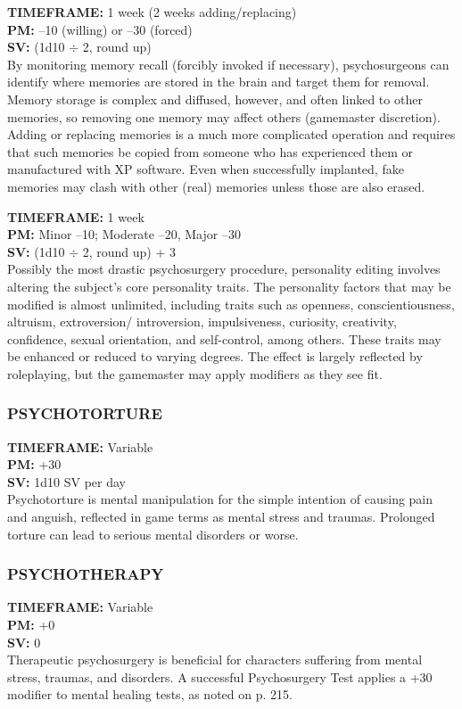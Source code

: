  \textbf{TIMEFRAME:} 1 week (2 weeks adding/replacing) \\ \textbf{PM:} –10 (willing) or –30 (forced) \\ \textbf{SV:} (1d10 $\div$ 2, round up) \\ By monitoring memory recall (forcibly invoked if necessary), psychosurgeons can identify where memories are stored in the brain and target them for removal. Memory storage is complex and diffused, however, and often linked to other memories, so removing one memory may affect others (gamemaster discretion). Adding or replacing memories is a much more complicated operation and requires that such memories be copied from someone who has experienced them or manufactured with XP software. Even when successfully implanted, fake memories may clash with other (real) memories unless those are also erased. 

 \textbf{TIMEFRAME:} 1 week \\ \textbf{PM:} Minor –10; Moderate –20, Major –30 \\ \textbf{SV:} (1d10 $\div$ 2, round up) + 3 \\ Possibly the most drastic psychosurgery procedure, personality editing involves altering the subject’s core personality traits. The personality factors that may be modified is almost unlimited, including traits such as openness, conscientiousness, altruism, extroversion/ introversion, impulsiveness, curiosity, creativity, confidence, sexual orientation, and self-control, among others. These traits may be enhanced or reduced to varying degrees. The effect is largely reflected by roleplaying, but the gamemaster may apply modifiers as they see fit. 

\subsubsection{PSYCHOTORTURE} \textbf{TIMEFRAME:} Variable \\ \textbf{PM:} +30 \\ \textbf{SV:} 1d10 SV per day \\ Psychotorture is mental manipulation for the simple intention of causing pain and anguish, reflected in game terms as mental stress and traumas. Prolonged torture can lead to serious mental disorders or worse. 

\subsubsection{PSYCHOTHERAPY} \textbf{TIMEFRAME:} Variable \\ \textbf{PM:} +0 \\ \textbf{SV:} 0 \\ Therapeutic psychosurgery is beneficial for characters suffering from mental stress, traumas, and disorders. A successful Psychosurgery Test applies a +30 modifier to mental healing tests, as noted on p. 215. 

